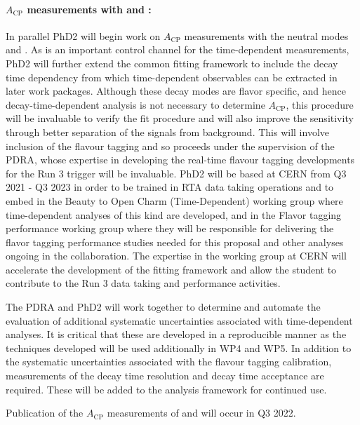 \documentclass[11pt,a4paper]{article}
\begin{document}
\paragraph{$A_{\text{CP}}$ measurements with \HepProcess{\APBs\to\PDminus\PDsplus} and \HepProcess{\APBzero\to\PDsminus\PDplus}:}
In parallel PhD2 will begin work on $A_\text{CP}$ measurements with the neutral \PB modes \HepProcess{\APBs\to\PDminus\PDsplus} and \HepProcess{\APBzero\to\PDsminus\PDplus}. As \HepProcess{\APBzero\to\PDsminus\PDplus} is an important control channel for the time-dependent measurements,  PhD2 will further extend the common fitting framework to include the decay time dependency from which time-dependent \CP observables can be extracted in later work packages.
Although these decay modes are flavor specific, and hence decay-time-dependent analysis is not necessary to determine $A_\text{CP}$, this procedure will be invaluable to verify the fit procedure and will also improve the sensitivity through better separation of the signals from background. This will involve inclusion of the flavour tagging and so proceeds under the supervision of the PDRA, whose expertise in developing the real-time flavour tagging developments for the Run 3 trigger will be invaluable. PhD2 will be based at CERN from Q3 2021 - Q3 2023 in order to be trained in RTA data taking operations and to embed in the \LHCb Beauty to Open Charm (Time-Dependent) working group where time-dependent analyses of this kind are developed, and in the Flavor tagging performance working group where they will be responsible for delivering the flavor tagging performance studies needed for this proposal  and other analyses ongoing in the \LHCb collaboration. The expertise in the working group at CERN will accelerate the development of the fitting framework and allow the student to contribute to the Run 3 data taking and performance activities.

The PDRA and PhD2 will work together to determine and automate the evaluation of additional systematic uncertainties associated with time-dependent analyses. It is critical that these are developed in a reproducible manner as the techniques developed will be used additionally in WP4 and WP5. In addition to the systematic uncertainties associated with the flavour tagging calibration, measurements of the decay time resolution and decay time acceptance are required. These will be added to the analysis framework for continued use.

Publication of the $A_{\text{CP}}$ measurements of \HepProcess{\APBs\to\PDminus\PDsplus} and \HepProcess{\APBzero\to\PDsminus\PDplus} will occur in Q3 2022.
\end{document}
